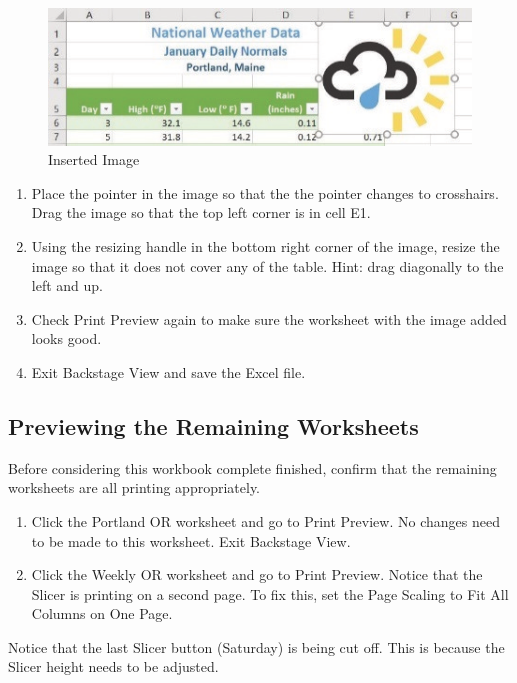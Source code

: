 \begin{figure}[H]
	\centering
	\includegraphics[width=\maxwidth{.95\linewidth}]{gfx/ch05_fig29}
	\caption{Inserted Image}
	\label{05:fig29}
\end{figure}

\begin{enumerate}
	\item Place the pointer in the image so that the the pointer changes to crosshairs. Drag the image so that the top left corner is in cell E1.
	\item Using the resizing handle in the bottom right corner of the image, resize the image so that it does not cover any of the table. Hint: drag diagonally to the left and up.
	\item Check Print Preview again to make sure the worksheet with the image added looks good.
\item Exit Backstage View and save the Excel file.
\end{enumerate}

\subsection{Previewing the Remaining Worksheets}

Before considering this workbook complete finished, confirm that the remaining worksheets are all printing appropriately.

\begin{enumerate}
	\item Click the Portland OR worksheet and go to Print Preview. No changes need to be made to this worksheet. Exit Backstage View.
	\item Click the Weekly OR worksheet and go to Print Preview. Notice that the Slicer is printing on a second page. To fix this, set the Page Scaling to Fit All Columns on One Page.
\end{enumerate}

Notice that the last Slicer button (Saturday) is being cut off. This is because the Slicer height needs to be adjusted.

